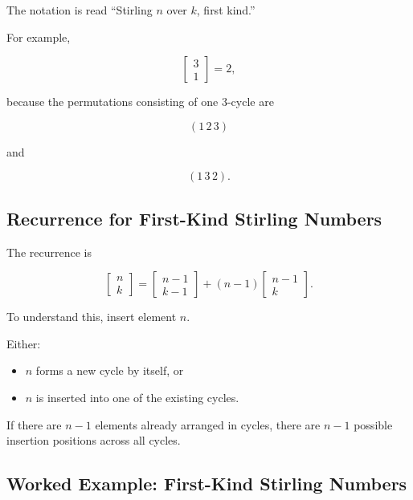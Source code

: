 The notation is read ``Stirling \(n\) over \(k\), first kind.''

For example,

\[
\left[
\begin{matrix}
3\\
1
\end{matrix}
\right]
=2,
\]

because the permutations consisting of one \(3\)-cycle are

\[
(1\,2\,3)
\]

and

\[
(1\,3\,2).
\]

\subsection{Recurrence for First-Kind Stirling Numbers}
\label{subsec:stirling-first-recurrence}

The recurrence is

\[
\boxed{
\left[
\begin{matrix}
n\\
k
\end{matrix}
\right]
=
\left[
\begin{matrix}
n-1\\
k-1
\end{matrix}
\right]
+
(n-1)
\left[
\begin{matrix}
n-1\\
k
\end{matrix}
\right].
}
\]

To understand this, insert element \(n\).

Either:

\begin{itemize}
    \item \(n\) forms a new cycle by itself, or
    \item \(n\) is inserted into one of the existing cycles.
\end{itemize}

If there are \(n-1\) elements already arranged in cycles, there are
\(n-1\) possible insertion positions across all cycles.

\subsection{Worked Example: First-Kind Stirling Numbers}
\label{subsec:worked-stirling-first}

